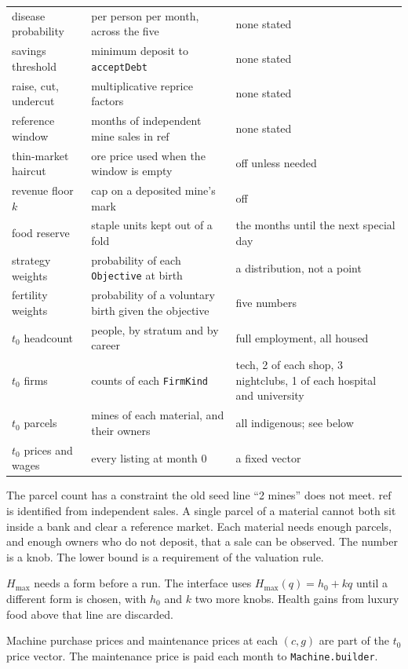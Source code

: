 \documentclass[11pt]{article}
\begin{document}
\begin{center}
\begin{longtable}{@{}>{\RaggedRight\hyphenpenalty=10000\arraybackslash}p{3.5cm}>{\RaggedRight\hyphenpenalty=10000\arraybackslash}p{6.2cm}>{\RaggedRight\hyphenpenalty=10000\arraybackslash}p{4.5cm}@{}}
disease probability & per person per month, across the five & none stated \\
savings threshold & minimum deposit to \texttt{acceptDebt} & none stated \\
raise, cut, undercut & multiplicative reprice factors & none stated \\
reference window & months of independent mine sales in $\mathrm{ref}$ & none stated \\
thin-market haircut & ore price used when the window is empty & off unless needed \\
revenue floor $k$ & cap on a deposited mine's mark & off \\
food reserve & staple units kept out of a fold & the months until the next special day \\
strategy weights & probability of each \texttt{Objective} at birth & a distribution, not a point \\
fertility weights & probability of a voluntary birth given the objective & five numbers \\
$t_0$ headcount & people, by stratum and by career & full employment, all housed \\
$t_0$ firms & counts of each \texttt{FirmKind} & 4 tech, 2 of each shop, 3 nightclubs, 1 of each hospital and university \\
$t_0$ parcels & mines of each material, and their owners & all indigenous; see below \\
$t_0$ prices and wages & every listing at month 0 & a fixed vector \\
\bottomrule
\end{longtable}
\end{center}

The parcel count has a constraint the old seed line ``2 mines'' does not
meet. $\mathrm{ref}$ is identified from independent sales. A single parcel
of a material cannot both sit inside a bank and clear a reference market.
Each material needs enough parcels, and enough owners who do not deposit,
that a sale can be observed. The number is a knob. The lower bound is a
requirement of the valuation rule.

$H_{\max}$ needs a form before a run. The interface uses
$H_{\max}(q) = h_0 + k q$ until a different form is chosen, with $h_0$ and
$k$ two more knobs. Health gains from luxury food above that line are
discarded.

Machine purchase prices and maintenance prices at each $(c, g)$ are part of
the $t_0$ price vector. The maintenance price is paid each month to
\texttt{Machine.builder}.
\end{document}
